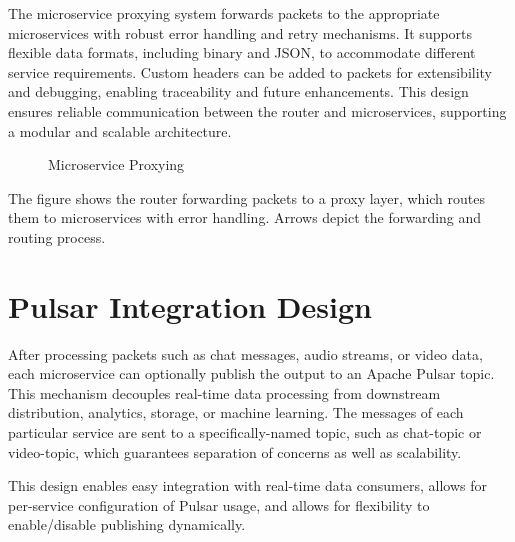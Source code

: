 The microservice proxying system forwards packets to the appropriate microservices with robust error handling and retry mechanisms. It supports flexible data formats, including binary and JSON, to accommodate different service requirements. Custom headers can be added to packets for extensibility and debugging, enabling traceability and future enhancements. This design ensures reliable communication between the router and microservices, supporting a modular and scalable architecture.



\begin{figure}[h]
\centering
{}
\caption{Microservice Proxying}
\label{fig:proxying}
\end{figure}

The figure shows the router forwarding packets to a proxy layer, which routes them to microservices with error handling. Arrows depict the forwarding and routing process.



\section{Pulsar Integration Design}

After processing packets such as chat messages, audio streams, or video data, each microservice can optionally publish the output to an Apache Pulsar topic. This mechanism decouples real-time data processing from downstream distribution, analytics, storage, or machine learning. The messages of each particular service are sent to a specifically-named topic, such as chat-topic or video-topic, which guarantees separation of concerns as well as scalability.

This design enables easy integration with real-time data consumers, allows for per-service configuration of Pulsar usage, and allows for flexibility to enable/disable publishing dynamically.



